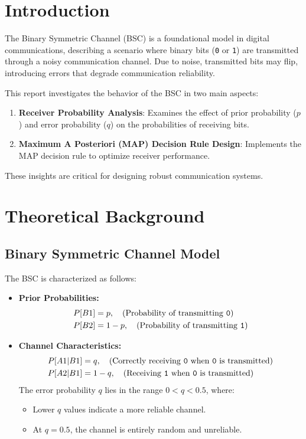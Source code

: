 \documentclass[a4paper,11pt]{article}
\begin{document}
\section{Introduction}
The Binary Symmetric Channel (BSC) is a foundational model in digital communications, describing a scenario where binary bits (\texttt{0} or \texttt{1}) are transmitted through a noisy communication channel. Due to noise, transmitted bits may flip, introducing errors that degrade communication reliability. 

This report investigates the behavior of the BSC in two main aspects:
\begin{enumerate}
    \item \textbf{Receiver Probability Analysis}: Examines the effect of prior probability ($p$) and error probability ($q$) on the probabilities of receiving bits.
    \item \textbf{Maximum A Posteriori (MAP) Decision Rule Design}: Implements the MAP decision rule to optimize receiver performance.
\end{enumerate}
These insights are critical for designing robust communication systems.

 

\section{Theoretical Background}
\subsection{Binary Symmetric Channel Model}
The BSC is characterized as follows:
\begin{itemize}
    \item \textbf{Prior Probabilities:}
    \begin{align*}
        P[B1] &= p, \quad \text{(Probability of transmitting \texttt{0})} \\
        P[B2] &= 1-p, \quad \text{(Probability of transmitting \texttt{1})}
    \end{align*}
    \item \textbf{Channel Characteristics:}
    \begin{align*}
        P[A1|B1] &= q, \quad \text{(Correctly receiving \texttt{0} when \texttt{0} is transmitted)} \\
        P[A2|B1] &= 1-q, \quad \text{(Receiving \texttt{1} when \texttt{0} is transmitted)}
    \end{align*}
    The error probability $q$ lies in the range $0 < q < 0.5$, where:
    \begin{itemize}
        \item Lower $q$ values indicate a more reliable channel.
        \item At $q = 0.5$, the channel is entirely random and unreliable.
    \end{itemize}
\end{itemize}
\end{document}
